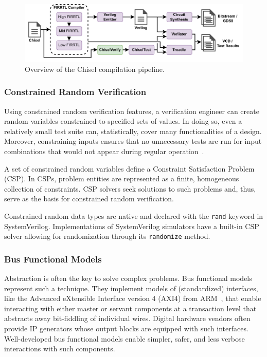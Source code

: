 \documentclass[conference]{IEEEtran}
\begin{document}
\begin{figure}
  \centering
    \includegraphics[width=0.8\linewidth]{Chisel_FIRRTL_VERILOG.pdf}
    \caption{Overview of the Chisel compilation pipeline.}
\label{fig:chisel-pipe}
\end{figure}

\subsubsection{Constrained Random Verification}
Using constrained random verification features, a verification engineer can create random variables constrained to 
specified sets of values. In doing so, even a relatively small test suite can, statistically, 
cover many functionalities of a design. Moreover, constraining inputs ensures that no 
unnecessary tests are run for input combinations that would not appear during regular 
operation~\cite{MehtaCRV2018}.

A set of constrained random variables define a Constraint Satisfaction Problem (CSP). In CSPs, 
problem entities are represented as a finite, homogeneous collection of constraints. CSP solvers 
seek solutions to such problems and, thus, serve as the basis for constrained random verification.

Constrained random data types are native and declared with the \texttt{rand} keyword in SystemVerilog. 
Implementations of SystemVerilog simulators have a built-in CSP solver allowing for randomization through its \texttt{randomize} method.

\subsubsection{Bus Functional Models}
Abstraction is often the key to solve complex problems. Bus functional models represent such 
a technique. They implement models of (standardized) interfaces, like the Advanced eXtensible Interface version 4 (AXI4) from ARM~\cite{axi4standard}, that enable 
interacting with either master or servant components at a transaction level that abstracts away 
bit-fiddling of individual wires. Digital hardware vendors often provide IP generators whose output 
blocks are equipped with such interfaces. Well-developed bus functional models enable simpler, safer, and less 
verbose interactions with such components.
\end{document}
